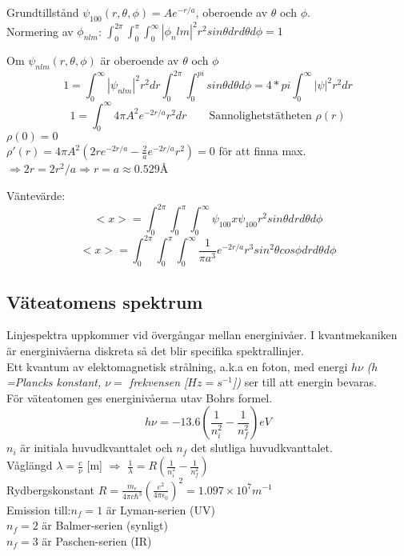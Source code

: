 \documentclass{article}
\begin{document}
\begin{enumerate}
        Grundtillstånd $\psi_{100}(r,\theta,\phi)=Ae^{-r/a}$, oberoende av $\theta$ och $\phi$.\\

        Normering av $\phi_{nlm}$: $\int_0^{2\pi}\int_0^{\pi}\int_0^{\infty}|\phi_nlm|^2r^2sin\theta drd\theta d\phi=1$

        Om $\psi_{nlm}(r,\theta,\phi)$ är oberoende av $\theta$ och $\phi$
        \[
          1=\int_{0}^{\infty}|\psi_{nlm}|^2r^2dr\int_0^{2\pi}\int_0^{pi}sin\theta d\theta d\phi=4*pi\int_0^{\infty}|\psi|^2r^2dr
        \]
        \[
          1=\int_0^{\infty}4\pi A^2e^{-2r/a}r^2dr\qquad\text{Sannolighetstätheten }\rho(r)
        \]
        $\rho(0)=0$\\
        $\rho'(r)=4\pi A^2(2re^{-2r/a}-\frac{2}{a}e^{-2r/a}r^2)= 0$ för att finna max.\\
        $\Rightarrow 2r=2r^2/a \Rightarrow r=a \approx 0.529$Å
      \end{enumerate}
      Väntevärde:
      \[
        <x>=\int_0^{2\pi}\int_0^{\pi}\int_0^{\infty}\psi_{100}x\psi_{100}r^2sin\theta dr d\theta d\phi
      \]
      \[
        <x>=\int_0^{2\pi}\int_0^{\pi}\int_0^{\infty}\frac{1}{\pi a^3}e^{-2r/a}r^3sin^2\theta cos\phi dr d\theta d\phi
      \]

    \subsection{Väteatomens spektrum}
      Linjespektra uppkommer vid övergångar mellan energinivåer. I kvantmekaniken är energinivåerna diskreta så det blir specifika spektrallinjer.\\
      Ett kvantum av elektomagnetisk strålning, a.k.a en foton, med energi $h\nu$ \textit{($h$=Plancks konstant, $\nu=$ frekvensen [$Hz=s^{-1}$])} ser till att energin bevaras.\\
      För väteatomen ges energinivåerna utav Bohrs formel.
      \[
        h\nu=-13.6(\frac{1}{n_i^2}-\frac{1}{n_f^2})eV
      \]
      $n_i$ är initiala huvudkvanttalet och $n_f$ det slutliga huvudkvanttalet.\\
      Våglängd $\lambda=\frac{c}{\nu}$ [m] $\Rightarrow$ $\frac{1}{\lambda}=R(\frac{1}{n_i^2}-\frac{1}{n_f^2})$\\
      Rydbergskonstant $R=\frac{m_e}{4\pi c\hbar^3}(\frac{e^2}{4\pi \epsilon_0})^2=1.097\times10^{7}m^{-1}$\\
      Emission till:$n_f=1$ är Lyman-serien (UV)\\
                    $n_f=2$ är Balmer-serien (synligt)\\
                    $n_f=3$ är Paschen-serien (IR)
\end{document}
